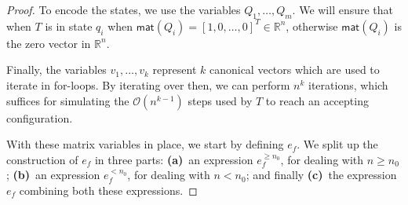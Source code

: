 \begin{proof}
    To encode the states, we use the variables $Q_1,\ldots,Q_m$. We will ensure that when $T$ is in state 
    $q_i$ when
    $\mathsf{mat}(Q_i)=[1,0,\ldots,0]^T\in\mathbb{R}^n$, otherwise $\mathsf{mat}(Q_i)$ is the zero 
    vector in $\mathbb{R}^n$.	

    Finally, the variables $v_1,\ldots,v_{k}$ represent $k$ canonical vectors  which are used to iterate 
    in for-loops. By iterating over then, we can perform $n^{k}$ iterations, 
    which suffices for simulating the $\mathcal{O}(n^{k-1})$ steps used by $T$ to reach an accepting configuration.

\smallskip

    With these matrix variables in place, we start by defining $e_f$. We split up the construction of $e_f$ in three
	parts: \textbf{(a)}~an expression $e_f^{\geq n_0}$, for dealing with $n\geq n_0$; \textbf{(b)}~an expression
	$e_f^{<n_0}$, for dealing with $n<n_0$; and finally \textbf{(c)}~the expression $e_f$ combining both these expressions. 




\end{proof}
